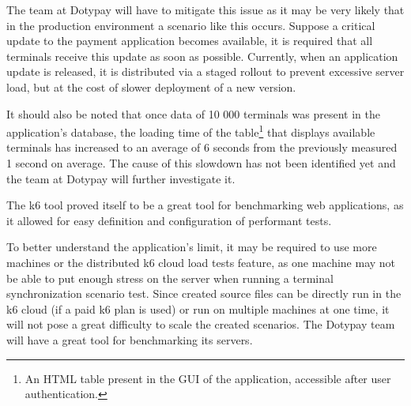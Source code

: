 \documentclass[12pt, a4paper]{article}
\begin{document}
The team at Dotypay will have to mitigate this issue as it may be very likely that in the production environment a scenario like this occurs.
Suppose a critical update to the payment application becomes available, it is required that all terminals receive this update as soon as possible.
Currently, when an application update is released, it is distributed via a staged rollout to prevent excessive server load, but at the cost of slower deployment of a new version.

It should also be noted that once data of 10 000 terminals was present in the application's database, the loading time of the table\footnote{An HTML table present in the GUI of the application, accessible after user authentication.} that displays available terminals has increased to an average of 6 seconds from the previously measured 1 second on average.
The cause of this slowdown has not been identified yet and the team at Dotypay will further investigate it.

The k6 tool proved itself to be a great tool for benchmarking web applications, as it allowed for easy definition and configuration of performant tests. 

To better understand the application's limit, it may be required to use more machines or the distributed k6 cloud load tests feature, as one machine may not be able to put enough stress on the server when running a terminal synchronization scenario test.
Since created source files can be directly run in the k6 cloud (if a paid k6 plan is used) or run on multiple machines at one time, it will not pose a great difficulty to scale the created scenarios. The Dotypay team will have a great tool for benchmarking its servers.
\end{document}
